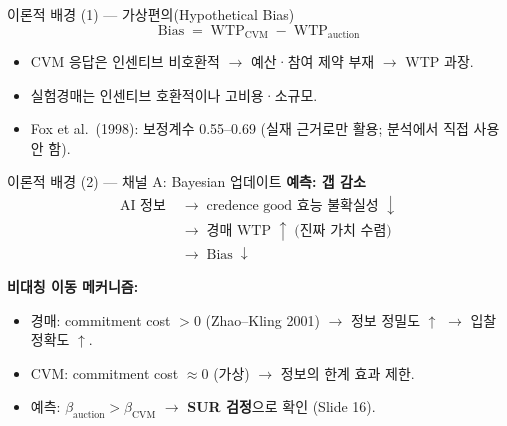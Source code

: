 \documentclass[aspectratio=169]{beamer}
\begin{document}

\begin{frame}{이론적 배경 (1) --- 가상편의(Hypothetical Bias)}
  \[
    \mathrm{Bias} \;=\; \mathrm{WTP}_{\text{CVM}} \;-\; \mathrm{WTP}_{\text{auction}}
  \]
  \begin{itemize}
    \item CVM 응답은 인센티브 비호환적 $\rightarrow$ 예산·참여 제약 부재 $\rightarrow$ WTP 과장.
    \item 실험경매는 인센티브 호환적이나 고비용·소규모.
    \item Fox et al.\ (1998): 보정계수 0.55--0.69 (실재 근거로만 활용; 분석에서 직접 사용 안 함).
  \end{itemize}

  \vspace{0.3em}
\end{frame}

\begin{frame}{이론적 배경 (2) --- 채널 A: Bayesian 업데이트}
  \textbf{예측: 갭 감소}
  \begin{align*}
    \text{AI 정보} \;&\rightarrow\; \text{credence good 효능 불확실성 } \downarrow \\
    &\rightarrow\; \text{경매 WTP } \uparrow \;\text{(진짜 가치 수렴)} \\
    &\rightarrow\; \text{Bias} \;\downarrow
  \end{align*}

  \textbf{비대칭 이동 메커니즘:}
  \begin{itemize}
    \item 경매: commitment cost $> 0$ (Zhao--Kling 2001) $\rightarrow$ 정보 정밀도 $\uparrow$ $\rightarrow$ 입찰 정확도 $\uparrow$.
    \item CVM: commitment cost $\approx 0$ (가상) $\rightarrow$ 정보의 한계 효과 제한.
    \item 예측: $\beta_{\text{auction}} > \beta_{\text{CVM}}$ $\rightarrow$ \textbf{SUR 검정}으로 확인 (Slide 16).
  \end{itemize}
\end{frame}
\end{document}
